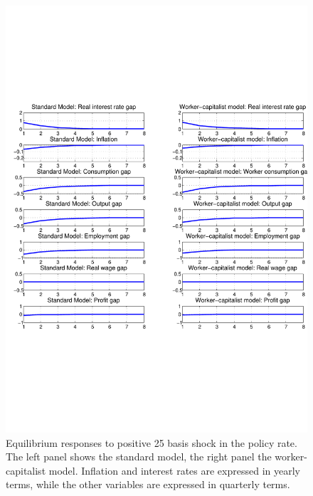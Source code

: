 \begin{figure}[ht] 
\centering 
\includegraphics[trim=0.3cm 7cm 0cm 6cm, clip, width=\textwidth]{./figures/monetary_std_nt_rigidwages.pdf} 
\caption{Equilibrium responses to positive 25 basis shock in the policy rate. The left panel shows the standard model, the right panel the worker-capitalist model. Inflation and interest rates are expressed in yearly terms, while the other variables are expressed in quarterly terms.} 
\label{fig_monetary_std_nt_rigidwages} 
\end{figure}